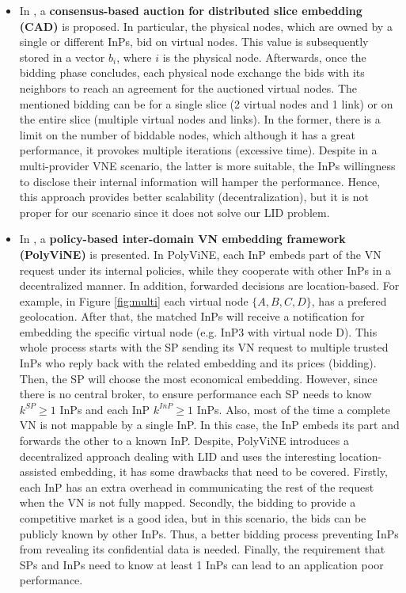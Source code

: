 \begin{itemize}
	\item In \citep{esposito2013general}, a \textbf{consensus-based auction for distributed slice embedding (CAD)} is proposed. In particular, the physical nodes, which are owned by a single or different InPs, bid on virtual nodes. This value is subsequently stored in a vector $b_i$, where $i$ is the physical node. Afterwards, once the bidding phase concludes, each physical node exchange the bids with its neighbors to reach an agreement for the auctioned virtual nodes. The mentioned bidding can be for a single slice (2 virtual nodes and 1 link) or on the entire slice (multiple virtual nodes and links). In the former, there is a limit on the number of biddable nodes, which although it has a great performance, it provokes multiple iterations (excessive time). Despite in a multi-provider VNE scenario, the latter is more suitable, the InPs willingness to disclose their internal information will hamper the performance. Hence, this approach provides better scalability (decentralization), but it is not proper for our scenario since it does not solve our LID problem.
	\item In \citep{chowdhury2010polyvine}, a \textbf{policy-based inter-domain VN embedding framework (PolyViNE)} is presented. In PolyViNE, each InP embeds part of the VN request under its internal policies, while they cooperate with other InPs in a decentralized manner. In addition, forwarded decisions are location-based. For example, in Figure \ref{fig:multi} each virtual node $\{A,B,C,D\}$, has a prefered geolocation. After that, the matched InPs will receive a notification for embedding the specific virtual node (e.g. InP3 with virtual node D). This whole process starts with the SP sending its VN request to multiple trusted InPs who reply back with the related embedding and its prices (bidding). Then, the SP will choose the most economical embedding. However, since there is no central broker, to ensure performance each SP needs to know $k^{SP} \geq 1$ InPs and each InP $k^{InP} \geq 1$ InPs. Also, most of the time a complete VN is not mappable by a single InP. In this case, the InP embeds its part and forwards the other to a known InP. \newline
Despite, PolyViNE introduces a decentralized approach dealing with LID and uses the interesting location-assisted embedding, it has some drawbacks that need to be covered. Firstly, each InP has an extra overhead in communicating the rest of the request when the VN is not fully mapped. Secondly, the bidding to provide a competitive market is a good idea, but in this scenario, the bids can be publicly known by other InPs. Thus, a better bidding process preventing InPs from revealing its confidential data is needed. Finally, the requirement that SPs and InPs need to know at least 1 InPs can lead to an application poor performance.
	

\end{itemize}
